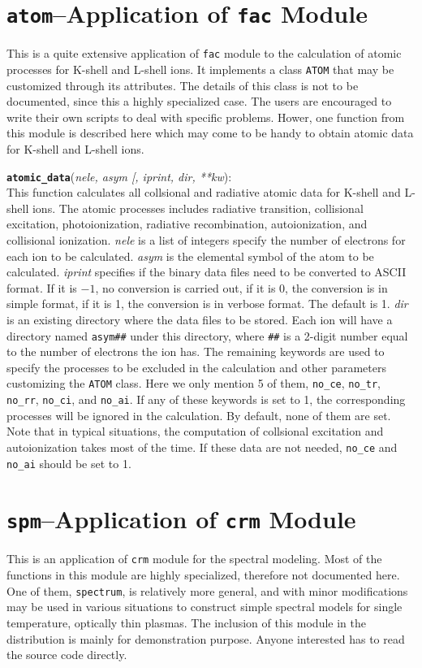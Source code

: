 \documentclass[twoside,letterpaper]{refrep}
\newcommand{\opt}[1]{
  {\textnormal{[}}{#1}\hspace{0.5mm}{\textnormal{]}}}
\newcommand{\var}[1]{\textit{#1}}
\newcommand{\key}[1]{\texttt{#1}}
\newcommand{\mod}[1]{\texttt{#1}}
\newenvironment{fundesc}[2]{
	\addcontentsline{toc}{subsubsection}{#1}
	\index{#1}
	\begin{center}
	\begin{minipage}{\textwidth}
	\key{\textbf{#1}}(\var{#2}):\\}
	{\end{minipage}\end{center}}
\begin{document}
\section{\mod{atom}--Application of \mod{fac} Module}
\label{sec:atom}
This is a quite extensive application of \mod{fac} module to the
calculation of atomic processes for K-shell and L-shell ions. It implements a
class \key{ATOM} that may be customized through its attributes. The details of
this class is not to be documented, since this a highly specialized case. The
users are encouraged to write their own scripts to deal with specific
problems. Hower, one function from this module is described here which may
come to be handy to obtain atomic data for K-shell and L-shell ions.
\begin{fundesc}{atomic\_data}{nele, asym\opt{, iprint, dir, \textnormal{**}kw}}
This function calculates all collsional and radiative atomic data for K-shell
and L-shell ions. The atomic processes includes radiative transition,
collisional excitation, photoionization, radiative recombination,
autoionization, and collisional ionization. \var{nele} is a list of integers
specify the number of electrons for each ion to be calculated. \var{asym} is
the elemental symbol of the atom to be calculated. \var{iprint} specifies if
the binary data files need to be converted to ASCII format. If it is $-1$, no
conversion is carried out, if it is 0, the conversion is in simple format,
if it is 1, the conversion is in verbose format. The default is 1. \var{dir}
is an existing directory where the data files to be stored. Each ion will have
a directory named \key{asym\#\#} under this directory, where \key{\#\#} is a
2-digit number equal to the number of electrons the ion has. The remaining
keywords are used to specify the processes to be excluded in the calculation
and other parameters customizing the \key{ATOM} class. Here we only mention 5
of them, \key{no\_ce}, \key{no\_tr}, \key{no\_rr}, \key{no\_ci}, and
\key{no\_ai}. If any of these keywords is set to 1, the corresponding processes
will be ignored in the calculation. By default, none of them are set. Note
that in typical situations, the computation of collsional excitation and
autoionization takes most of the time. If these data are not needed,
\key{no\_ce} and \key{no\_ai} should be set to 1.
\end{fundesc}

\section{\mod{spm}--Application of \mod{crm} Module}
\label{sec:spm}
This is an application of \mod{crm} module for the spectral modeling. Most of
the functions in this module are highly specialized, therefore not documented
here. One of them, \key{spectrum}, is relatively more general, and with minor
modifications may be used in various situations to construct simple spectral
models for single temperature, optically thin plasmas. The inclusion of this
module in the distribution is mainly for demonstration purpose. Anyone
interested has to read the source code directly.
\end{document}
